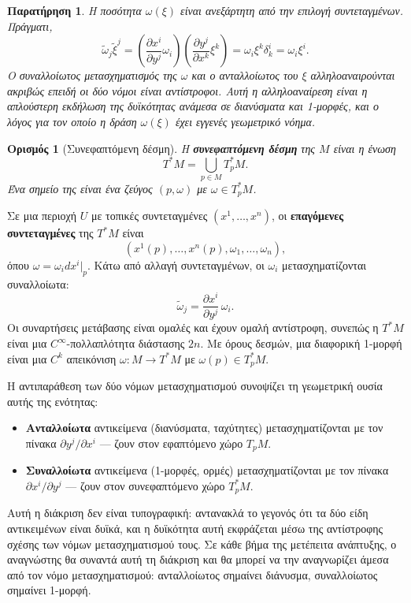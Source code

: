 \documentclass[11pt,a4paper,twoside,openright]{book}
\newtheorem{remark}[lemma]{Παρατήρηση}
\newtheorem{definition}[lemma]{Ορισμός}
\begin{document}
\begin{remark}
Η ποσότητα $\omega(\xi)$ είναι ανεξάρτητη από την επιλογή συντεταγμένων. Πράγματι,
\[
\tilde{\omega}_j \tilde{\xi}^j = \left( \frac{\partial x^i}{\partial y^j} \omega_i \right) \left( \frac{\partial y^j}{\partial x^k} \xi^k \right) = \omega_i \xi^k \delta^i_k = \omega_i \xi^i.
\]
Ο συναλλοίωτος μετασχηματισμός της $\omega$ και ο ανταλλοίωτος του $\xi$ αλληλοαναιρούνται ακριβώς επειδή οι δύο νόμοι είναι αντίστροφοι. Αυτή η αλληλοαναίρεση είναι η απλούστερη εκδήλωση της δυϊκότητας ανάμεσα σε διανύσματα και 1-μορφές, και ο λόγος για τον οποίο η δράση $\omega(\xi)$ έχει εγγενές γεωμετρικό νόημα.
\end{remark}

\begin{definition}[Συνεφαπτόμενη δέσμη]
Η \textbf{συνεφαπτόμενη δέσμη} της $M$ είναι η ένωση
\begin{equation}
T^*M = \bigcup_{p \in M} T_p^*M.
\end{equation}
Ένα σημείο της είναι ένα ζεύγος $(p, \omega)$ με $\omega \in T_p^*M$.
\end{definition}

Σε μια περιοχή $U$ με τοπικές συντεταγμένες $(x^1, \dots, x^n)$, οι \textbf{επαγόμενες συντεταγμένες} της $T^*M$ είναι
\begin{equation}
(x^1(p), \dots, x^n(p), \omega_1, \dots, \omega_n),
\end{equation}
όπου $\omega = \omega_i dx^i|_p$. Κάτω από αλλαγή συντεταγμένων, οι $\omega_i$ μετασχηματίζονται συναλλοίωτα:
\begin{equation}
\tilde{\omega}_j = \frac{\partial x^i}{\partial y^j} \, \omega_i.
\end{equation}
Οι συναρτήσεις μετάβασης είναι ομαλές και έχουν ομαλή αντίστροφη, συνεπώς η $T^*M$ είναι μια $C^\infty$-πολλαπλότητα διάστασης $2n$. Με όρους δεσμών, μια διαφορική 1-μορφή είναι μια $C^k$ απεικόνιση $\omega: M \to T^*M$ με $\omega(p) \in T_p^*M$.

Η αντιπαράθεση των δύο νόμων μετασχηματισμού συνοψίζει τη γεωμετρική ουσία αυτής της ενότητας:
\begin{itemize}
\item \textbf{Ανταλλοίωτα} αντικείμενα (διανύσματα, ταχύτητες) μετασχηματίζονται με τον πίνακα $\partial y^j / \partial x^i$ --- ζουν στον εφαπτόμενο χώρο $T_pM$.
\item \textbf{Συναλλοίωτα} αντικείμενα (1-μορφές, ορμές) μετασχηματίζονται με τον πίνακα $\partial x^i / \partial y^j$ --- ζουν στον συνεφαπτόμενο χώρο $T_p^*M$.
\end{itemize}
Αυτή η διάκριση δεν είναι τυπογραφική: αντανακλά το γεγονός ότι τα δύο είδη αντικειμένων είναι δυϊκά, και η δυϊκότητα αυτή εκφράζεται μέσω της αντίστροφης σχέσης των νόμων μετασχηματισμού τους. Σε κάθε βήμα της μετέπειτα ανάπτυξης, ο αναγνώστης θα συναντά αυτή τη διάκριση και θα μπορεί να την αναγνωρίζει άμεσα από τον νόμο μετασχηματισμού: ανταλλοίωτος σημαίνει διάνυσμα, συναλλοίωτος σημαίνει 1-μορφή.
\end{document}
